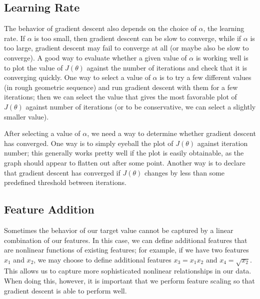 \documentclass{article}
\begin{document}
\subsection{Learning Rate}
The behavior of gradient descent also depends on the choice of $\alpha$, the learning rate. If $\alpha$ is too small, then gradient descent can be slow to converge, while if $\alpha$ is too large, gradient descent may fail to converge at all (or maybe also be slow to converge). A good way to evaluate whether a given value of $\alpha$ is working well is to plot the value of $J(\theta)$ against the number of iterations and check that it is converging quickly. One way to select a value of $\alpha$ is to try a few different values (in rough geometric sequence) and run gradient descent with them for a few iterations; then we can select the value that gives the most favorable plot of $J(\theta)$ against number of iterations (or to be conservative, we can select a slightly smaller value).

After selecting a value of $\alpha$, we need a way to determine whether gradient descent has converged. One way is to simply eyeball the plot of $J(\theta)$ against iteration number; this generally works pretty well if the plot is easily obtainable, as the graph should appear to flatten out after some point. Another way is to declare that gradient descent has converged if $J(\theta)$ changes by less than some predefined threshold between iterations.
\subsection{Feature Addition}
Sometimes the behavior of our target value cannot be captured by a linear combination of our features. In this case, we can define additional features that are nonlinear functions of existing features; for example, if we have two features $x_1$ and $x_2$, we may choose to define additional features $x_3 = x_1x_2$ and $x_4 = \sqrt{x_2}$. This allows us to capture more sophisticated nonlinear relationships in our data. When doing this, however, it is important that we perform feature scaling so that gradient descent is able to perform well.
\end{document}
